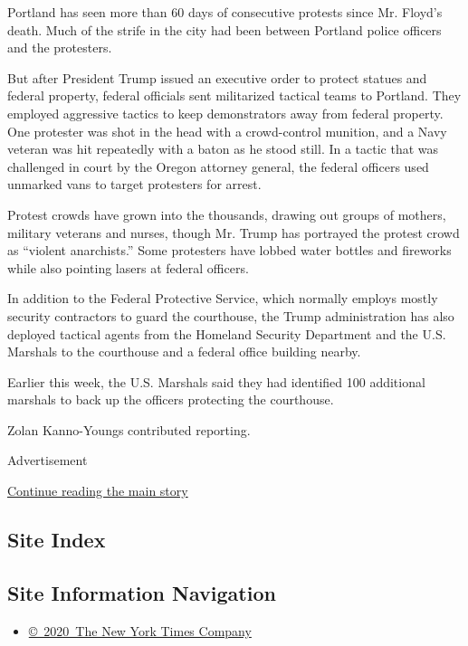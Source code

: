 Portland has seen more than 60 days of consecutive protests since Mr.
Floyd's death. Much of the strife in the city had been between Portland
police officers and the protesters.

But after President Trump issued an executive order to protect statues
and federal property, federal officials sent militarized tactical teams
to Portland. They employed aggressive tactics to keep demonstrators away
from federal property. One protester was shot in the head with a
crowd-control munition, and a Navy veteran was hit repeatedly with a
baton as he stood still. In a tactic that was challenged in court by the
Oregon attorney general, the federal officers used unmarked vans to
target protesters for arrest.

Protest crowds have grown into the thousands, drawing out groups of
mothers, military veterans and nurses, though Mr. Trump has portrayed
the protest crowd as ``violent anarchists.'' Some protesters have lobbed
water bottles and fireworks while also pointing lasers at federal
officers.

In addition to the Federal Protective Service, which normally employs
mostly security contractors to guard the courthouse, the Trump
administration has also deployed tactical agents from the Homeland
Security Department and the U.S. Marshals to the courthouse and a
federal office building nearby.

Earlier this week, the U.S. Marshals said they had identified 100
additional marshals to back up the officers protecting the courthouse.

Zolan Kanno-Youngs contributed reporting.

Advertisement

\protect\hyperlink{after-bottom}{Continue reading the main story}

\hypertarget{site-index}{%
\subsection{Site Index}\label{site-index}}

\hypertarget{site-information-navigation}{%
\subsection{Site Information
Navigation}\label{site-information-navigation}}

\begin{itemize}
\tightlist
\item
  \href{https://help.nytimes3xbfgragh.onion/hc/en-us/articles/115014792127-Copyright-notice}{©~2020~The
  New York Times Company}
\end{itemize}

